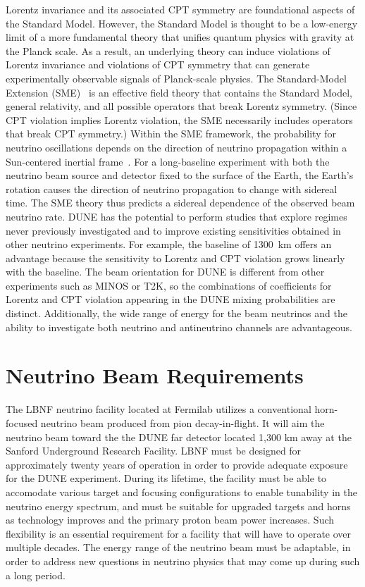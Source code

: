 Lorentz invariance and its associated CPT symmetry
are foundational aspects of the Standard Model. However, the Standard Model is thought to be a low-energy limit of a more fundamental theory that unifies quantum physics with gravity at the Planck
scale. As a result, an underlying theory can induce violations of Lorentz invariance and
violations of CPT symmetry that can generate experimentally observable signals of Planck-scale physics.
The Standard-Model Extension (SME)~\cite{Colladay:1996iz,Colladay:1998fq,Kostelecky:2003fs} is an effective field theory that contains the Standard Model, general relativity, and all possible operators that break Lorentz symmetry. (Since CPT violation implies Lorentz violation, the SME necessarily includes operators that break CPT symmetry.)  Within the SME framework, the probability for neutrino oscillations depends on the direction of neutrino propagation within a Sun-centered inertial frame~\cite{Kostelecky:2003cr,Kostelecky:2011gq}.  For a long-baseline experiment with both the neutrino beam source and detector fixed to the surface of the Earth, the Earth's rotation causes the direction of neutrino propagation to change with sidereal time.  The SME theory thus predicts a sidereal dependence of the observed beam neutrino rate.  DUNE has the potential to perform studies that explore regimes never previously investigated and to improve existing
sensitivities obtained in other neutrino experiments.
For example, the baseline of 1300~km offers an advantage because the sensitivity to 
Lorentz and CPT violation grows linearly with the baseline.   The
beam orientation for DUNE is different from other experiments such as MINOS or T2K, so
the combinations of coefficients for Lorentz and CPT violation appearing in the DUNE mixing probabilities are
distinct. Additionally, the wide range of energy for the beam neutrinos and the ability to investigate both neutrino and antineutrino channels are advantageous.

\section{Neutrino Beam Requirements}
\label{sec:physics-lbnosc-beam-req}
The LBNF neutrino facility located at Fermilab utilizes a conventional
horn-focused neutrino beam produced from pion decay-in-flight. It will
aim the neutrino beam toward the 
the DUNE far detector located 1,300 km away at the Sanford Underground
Research Facility. LBNF must be designed for approximately twenty years of operation in order to provide adequate exposure for the DUNE experiment. During its lifetime, the facility must be able to accomodate various target and focusing configurations to enable tunability 
in the neutrino energy spectrum, and must be suitable for upgraded targets and horns as technology improves and the primary proton beam power increases. Such
flexibility is an essential requirement for a facility that will have to operate over multiple decades. The energy range of the neutrino beam must be adaptable, in order to address new questions in neutrino physics that may come up during such a long period.


